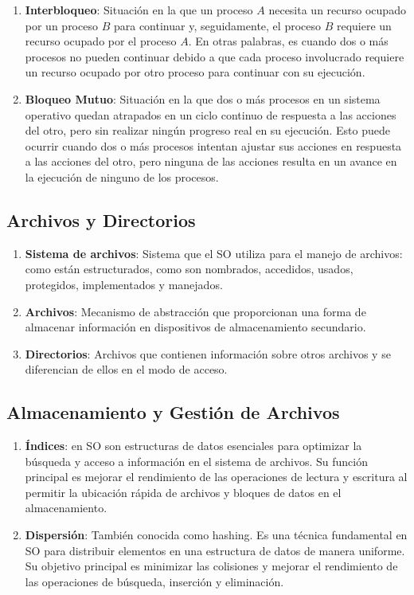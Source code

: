 \documentclass[12pt, a4paper]{article} %
\begin{document}
\begin{enumerate}[resume*]
	\item \textbf{Interbloqueo}: Situación en la que un proceso $A$ necesita un recurso ocupado por un proceso $B$ para continuar y, seguidamente, el proceso $B$ requiere un recurso ocupado por el proceso $A$. En otras palabras, es cuando dos o más procesos no pueden continuar debido a que cada proceso involucrado requiere un recurso ocupado por otro proceso para continuar con su ejecución.
	
	\item \textbf{Bloqueo Mutuo}: Situación en la que dos o más procesos en un sistema operativo quedan atrapados en un ciclo continuo de respuesta a las acciones del otro, pero sin realizar ningún progreso real en su ejecución. Esto puede ocurrir cuando dos o más procesos intentan ajustar sus acciones en respuesta a las acciones del otro, pero ninguna de las acciones resulta en un avance en la ejecución de ninguno de los procesos.
\end{enumerate}

\subsection{Archivos y Directorios}

\begin{enumerate}[resume*]
	\item \textbf{Sistema de archivos}: Sistema que el SO utiliza para el manejo de archivos: como están estructurados, como son nombrados, accedidos, usados, protegidos, implementados y manejados.
	
	\item \textbf{Archivos}: Mecanismo de abstracción que proporcionan una forma de almacenar información en dispositivos de almacenamiento secundario.
	
	\item \textbf{Directorios}: Archivos que contienen información sobre otros archivos y se diferencian de ellos en el modo de acceso.
\end{enumerate}

\subsection{Almacenamiento y Gestión de Archivos}

\begin{enumerate}[resume*]
	\item \textbf{Índices}: en SO son estructuras de datos esenciales para optimizar la búsqueda y acceso a información en el sistema de archivos. Su función principal es mejorar el rendimiento de las operaciones de lectura y escritura al permitir la ubicación rápida de archivos y bloques de datos en el almacenamiento.
	
	\item \textbf{Dispersión}: También conocida como hashing. Es una técnica fundamental en SO para distribuir elementos en una estructura de datos de manera uniforme. Su objetivo principal es minimizar las colisiones y mejorar el rendimiento de las operaciones de búsqueda, inserción y eliminación.
\end{enumerate}
\end{document}
